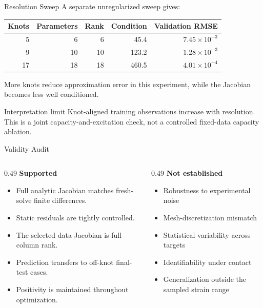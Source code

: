 \documentclass[aspectratio=169,10pt]{beamer}
\newcommand{\good}[1]{\textcolor{pgoGreen}{#1}}
\newcommand{\warn}[1]{\textcolor{pgoOrange}{#1}}
\begin{document}
\begin{frame}{Resolution Sweep}
  \small
  A separate unregularized sweep gives:
  \begin{table}
    \centering
    \begin{tabular}{rrrrr}
      \toprule
      Knots & Parameters & Rank & Condition & Validation RMSE \\
      \midrule
      5 & 6 & 6 & 45.4 & $7.45\times10^{-3}$ \\
      9 & 10 & 10 & 123.2 & $1.28\times10^{-3}$ \\
      17 & 18 & 18 & 460.5 & $4.01\times10^{-4}$ \\
      \bottomrule
    \end{tabular}
  \end{table}

  More knots reduce approximation error in this experiment, while the
  Jacobian becomes less well conditioned.

  \begin{alertblock}{Interpretation limit}
    Knot-aligned training observations increase with resolution. This is a
    joint capacity-and-excitation check, not a controlled fixed-data
    capacity ablation.
  \end{alertblock}
\end{frame}

\begin{frame}{Validity Audit}
  \small
  \begin{columns}[T]
    \begin{column}{0.49\linewidth}
      \textbf{\good{Supported}}
      \begin{itemize}
        \item Full analytic Jacobian matches fresh-solve finite differences.
        \item Static residuals are tightly controlled.
        \item The selected data Jacobian is full column rank.
        \item Prediction transfers to off-knot final-test cases.
        \item Positivity is maintained throughout optimization.
      \end{itemize}
    \end{column}
    \begin{column}{0.49\linewidth}
      \textbf{\warn{Not established}}
      \begin{itemize}
        \item Robustness to experimental noise
        \item Mesh-discretization mismatch
        \item Statistical variability across targets
        \item Identifiability under contact
        \item Generalization outside the sampled strain range
      \end{itemize}
    \end{column}
  \end{columns}
\end{frame}
\end{document}
